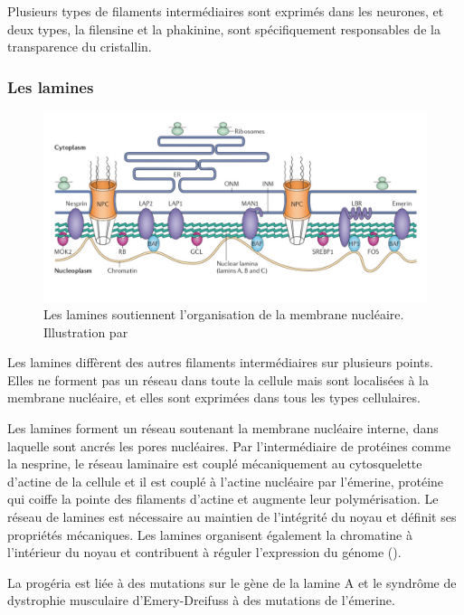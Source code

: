 Plusieurs types de filaments intermédiaires sont exprimés dans les neurones, et deux types, la filensine et la phakinine, sont spécifiquement responsables de la transparence du cristallin. 

\subsubsection{Les lamines}
\begin{figure}
\includegraphics[scale=1.5]{Structure_and_function_of_the_nuclear_lamina.jpg}
\caption{Les lamines soutiennent l'organisation de la membrane nucléaire. Illustration par  \cite{coutinho_molecular_2009}}
\end{figure}
Les lamines diffèrent des autres filaments intermédiaires sur plusieurs points. Elles ne forment pas un réseau dans toute la cellule mais sont localisées à la membrane nucléaire, et elles sont exprimées dans tous les types cellulaires. 

Les lamines forment un réseau soutenant la membrane nucléaire interne, dans laquelle sont ancrés les pores nucléaires. Par l'intermédiaire de protéines comme la nesprine, le réseau laminaire est couplé mécaniquement au cytosquelette d'actine de la cellule et il est couplé à l'actine nucléaire par l'émerine, protéine qui coiffe la pointe des filaments d'actine et augmente leur polymérisation. 
Le réseau de lamines est nécessaire au maintien de l'intégrité du noyau et définit ses propriétés mécaniques. 
Les lamines organisent également la chromatine à l'intérieur du noyau et contribuent à réguler l'expression du génome (\cite{dechat_nuclear_2008}).

La progéria est liée à des mutations sur le gène de la lamine A  et le syndrôme de dystrophie musculaire d'Emery-Dreifuss à des mutations de l'émerine. 


